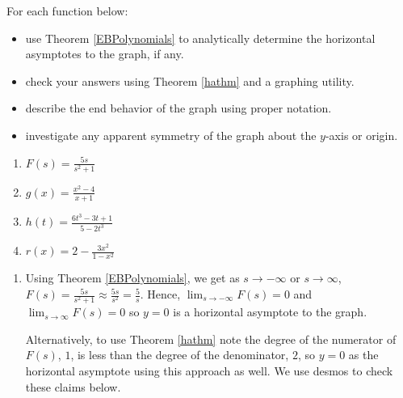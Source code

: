 \documentclass{ximera}
\begin{document}
\begin{example} \label{haexample} For each function below:

\begin{itemize}

\item use Theorem \ref{EBPolynomials} to  analytically determine the horizontal asymptotes to the graph, if any.

\item check your answers using Theorem \ref{hathm} and a graphing utility.   

\item describe the end behavior of the graph using proper notation.

\item  investigate any apparent symmetry of the graph about the $y$-axis or origin.

\end{itemize}

\begin{enumerate}

\item $F(s) = \frac{5s}{s^2+1}$  

\item  $g(x) = \frac{x^2-4}{x+1}$ 

\item  $h(t) = \frac{6t^3-3t+1}{5-2t^3}$

\item  $r(x) = 2 - \frac{3x^2}{1-x^2}$ 

\end{enumerate}

\begin{explanation}

\begin{enumerate}

\item  Using  Theorem \ref{EBPolynomials}, we get as $s \rightarrow  -\infty$ or $s \rightarrow \infty$, $F(s) = \frac{5s}{s^2+1}  \approx \frac{5s}{s^2} = \frac{5}{s}$.  Hence, $\lim_{s \rightarrow  -\infty} F(s) = 0$ and $\lim_{s \rightarrow  \infty} F(s) = 0$   so $y = 0$ is a horizontal asymptote to the graph.  

Alternatively, to use Theorem \ref{hathm} note the degree of the numerator of  $F(s)$,  $1$, is less than the degree of the denominator, $2$,  so  $y=0$ as the horizontal asymptote using this approach as well. We use desmos to check these claims below.


\end{enumerate}
\end{explanation}
\end{example}
\end{document}
